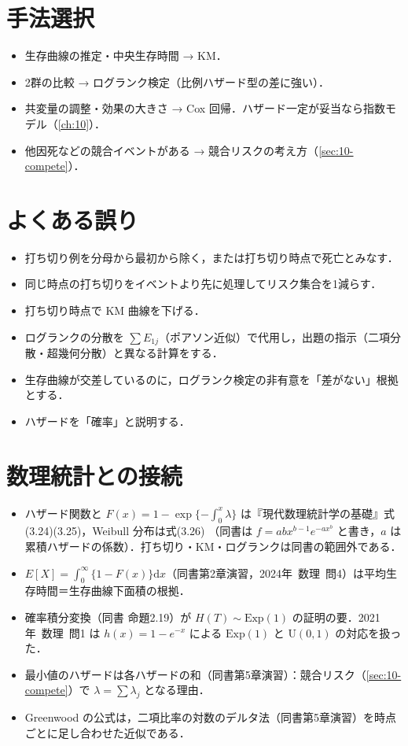 \documentclass[a4paper,11pt,openany]{ltjsbook}
\newcommand{\kakomonSM}[2]{\mbox{#1年 数理 問#2}}
\newcommand{\dd}{\mathrm{d}}
\newcommand{\Ex}{\mathrm{Exp}}
\newcommand{\Unif}{\mathrm{U}}
\begin{document}
\section{手法選択}\label{sec:09-choice}
\begin{itemize}
\item 生存曲線の推定・中央生存時間 → KM．
\item 2群の比較 → ログランク検定（比例ハザード型の差に強い）．
\item 共変量の調整・効果の大きさ → Cox 回帰．ハザード一定が妥当なら指数モデル（\cref{ch:10}）．
\item 他因死などの競合イベントがある → 競合リスクの考え方（\cref{sec:10-compete}）．
\end{itemize}

\section{よくある誤り}\label{sec:09-err}
\begin{warnbox}
\begin{itemize}
\item 打ち切り例を分母から最初から除く，または打ち切り時点で死亡とみなす．
\item 同じ時点の打ち切りをイベントより先に処理してリスク集合を1減らす．
\item 打ち切り時点で KM 曲線を下げる．
\item ログランクの分散を $\sum E_{1j}$（ポアソン近似）で代用し，出題の指示（二項分散・超幾何分散）と異なる計算をする．
\item 生存曲線が交差しているのに，ログランク検定の非有意を「差がない」根拠とする．
\item ハザードを「確率」と説明する．
\end{itemize}
\end{warnbox}

\section{数理統計との接続}\label{sec:09-link}
\begin{linkbox}
\begin{itemize}
\item ハザード関数と $F(x)=1-\exp\{-\int_0^x\lambda\}$ は『現代数理統計学の基礎』式(3.24)(3.25)，Weibull 分布は式(3.26)
      （同書は $f=abx^{b-1}e^{-ax^b}$ と書き，$a$ は累積ハザードの係数）．打ち切り・KM・ログランクは同書の範囲外である．
\item $E[X]=\int_0^\infty\{1-F(x)\}\dd x$（同書第2章演習，\kakomonSM{2024}{4}）は平均生存時間＝生存曲線下面積の根拠．
\item 確率積分変換（同書 命題2.19）が $H(T)\sim\Ex(1)$ の証明の要．\kakomonSM{2021}{1} は $h(x)=1-e^{-x}$ による $\Ex(1)$ と $\Unif(0,1)$ の対応を扱った．
\item 最小値のハザードは各ハザードの和（同書第5章演習）：競合リスク（\cref{sec:10-compete}）で $\lambda=\sum\lambda_j$ となる理由．
\item Greenwood の公式は，二項比率の対数のデルタ法（同書第5章演習）を時点ごとに足し合わせた近似である．
\end{itemize}
\end{linkbox}
\end{document}

